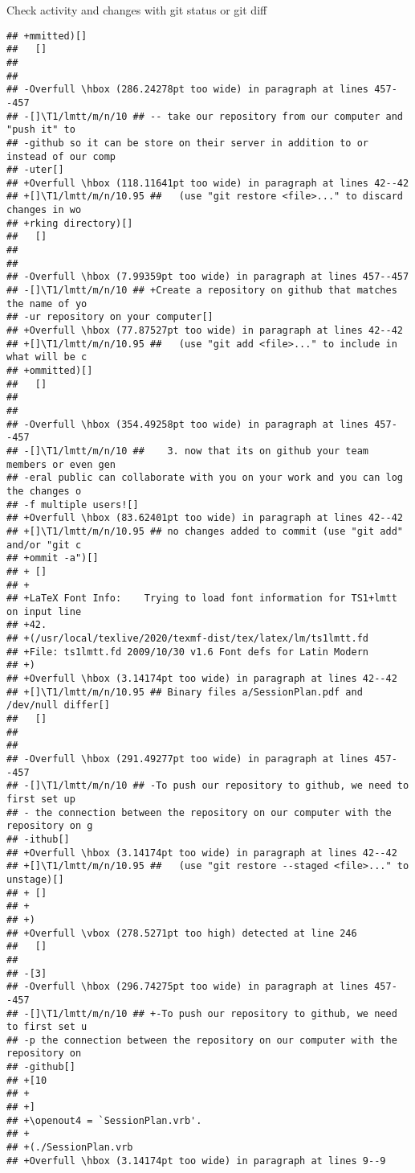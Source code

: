 \documentclass[ignorenonframetext,]{beamer}
\begin{document}
\begin{frame}[fragile]{Check activity and changes with git status or git
diff}
\begin{verbatim}
## +mmitted)[] 
##   []
##  
##  
## -Overfull \hbox (286.24278pt too wide) in paragraph at lines 457--457
## -[]\T1/lmtt/m/n/10 ## -- take our repository from our computer and "push it" to 
## -github so it can be store on their server in addition to or instead of our comp
## -uter[] 
## +Overfull \hbox (118.11641pt too wide) in paragraph at lines 42--42
## +[]\T1/lmtt/m/n/10.95 ##   (use "git restore <file>..." to discard changes in wo
## +rking directory)[] 
##   []
##  
##  
## -Overfull \hbox (7.99359pt too wide) in paragraph at lines 457--457
## -[]\T1/lmtt/m/n/10 ## +Create a repository on github that matches the name of yo
## -ur repository on your computer[] 
## +Overfull \hbox (77.87527pt too wide) in paragraph at lines 42--42
## +[]\T1/lmtt/m/n/10.95 ##   (use "git add <file>..." to include in what will be c
## +ommitted)[] 
##   []
##  
##  
## -Overfull \hbox (354.49258pt too wide) in paragraph at lines 457--457
## -[]\T1/lmtt/m/n/10 ##    3. now that its on github your team members or even gen
## -eral public can collaborate with you on your work and you can log the changes o
## -f multiple users![] 
## +Overfull \hbox (83.62401pt too wide) in paragraph at lines 42--42
## +[]\T1/lmtt/m/n/10.95 ## no changes added to commit (use "git add" and/or "git c
## +ommit -a")[] 
## + []
## +
## +LaTeX Font Info:    Trying to load font information for TS1+lmtt on input line 
## +42.
## +(/usr/local/texlive/2020/texmf-dist/tex/latex/lm/ts1lmtt.fd
## +File: ts1lmtt.fd 2009/10/30 v1.6 Font defs for Latin Modern
## +)
## +Overfull \hbox (3.14174pt too wide) in paragraph at lines 42--42
## +[]\T1/lmtt/m/n/10.95 ## Binary files a/SessionPlan.pdf and /dev/null differ[] 
##   []
##  
##  
## -Overfull \hbox (291.49277pt too wide) in paragraph at lines 457--457
## -[]\T1/lmtt/m/n/10 ## -To push our repository to github, we need to first set up
## - the connection between the repository on our computer with the repository on g
## -ithub[] 
## +Overfull \hbox (3.14174pt too wide) in paragraph at lines 42--42
## +[]\T1/lmtt/m/n/10.95 ##   (use "git restore --staged <file>..." to unstage)[] 
## + []
## +
## +)
## +Overfull \vbox (278.5271pt too high) detected at line 246
##   []
##  
## -[3]
## -Overfull \hbox (296.74275pt too wide) in paragraph at lines 457--457
## -[]\T1/lmtt/m/n/10 ## +-To push our repository to github, we need to first set u
## -p the connection between the repository on our computer with the repository on 
## -github[] 
## +[10
## +
## +]
## +\openout4 = `SessionPlan.vrb'.
## +
## +(./SessionPlan.vrb
## +Overfull \hbox (3.14174pt too wide) in paragraph at lines 9--9

\end{verbatim}
\end{frame}
\end{document}
